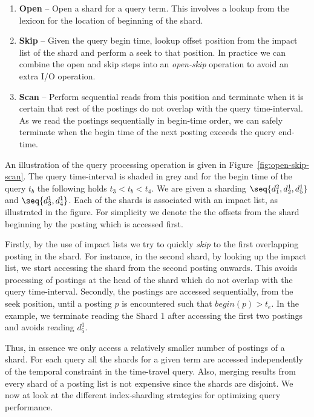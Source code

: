 \begin{enumerate}
\item \textbf{Open} -- Open a shard for a query term. This involves a lookup from the lexicon for the location of beginning of the shard.

\item \textbf{Skip} -- Given the query begin time, lookup offset 
position from the impact list of the shard and perform a seek to that 
position. In practice we can combine the open and skip steps into an
\emph{open-skip} operation to avoid an extra I/O operation. 

\item \textbf{Scan} -- Perform sequential reads from this position and
  terminate when it is certain that rest of the postings do not overlap
  with the query time-interval. As we read the postings sequentially in
  begin-time order, we can safely terminate when the begin time of the
  next posting exceeds the query end-time.
\end{enumerate}

An illustration of the query processing operation is given in Figure~\ref{fig:open-skip-scan}. The query time-interval is shaded in grey and for the begin time of the query $t_b$ the following holds $ t_3 < t_b < t_4$. We are given a sharding $\seq{ d_1^2, d_2^1, d_5^1}$ and $\seq{ d_3^1, d_4^1}$. Each of the shards is associated with an impact list, as illustrated in the figure. For simplicity we denote the the offsets from the shard beginning by the posting which is accessed first. 

Firstly, by the use of impact lists we try to quickly \emph{skip} to the first overlapping posting in the shard. For instance, in the second shard, by looking up the impact list, we start accessing the shard from the second posting onwards. This avoids processing of postings at the head of the shard which do not overlap with the query time-interval. Secondly, the postings are accessed sequentially, from the seek position, until a posting $p$ is encountered such that $begin(p) > t_e$. In the example, we terminate reading the Shard 1 after accessing the first two postings and avoids reading $d_5^1$.

Thus, in essence we only access a relatively smaller number of postings of a shard. For each query all the shards for a given term are accessed
independently of the temporal constraint in the time-travel query. Also, merging results from every shard of a posting list is
not expensive since the shards are disjoint. We now at look at the different index-sharding strategies for optimizing query performance.


